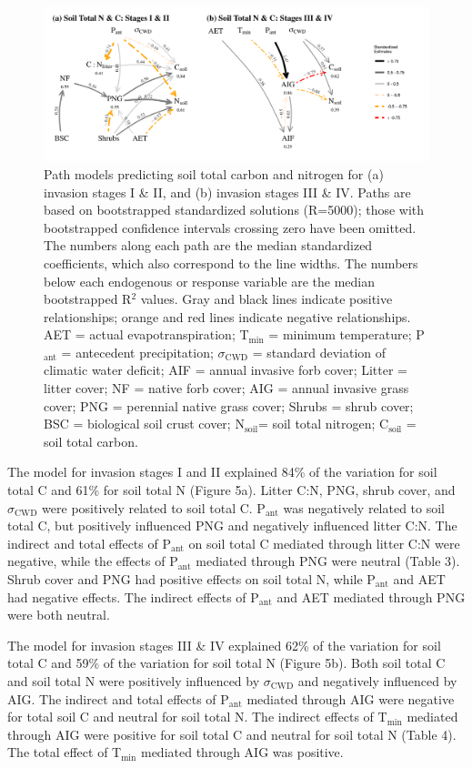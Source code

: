 \documentclass[
  11pt,
  a4paper,
]{article}
\begin{document}
\begin{figure}
\centering
\includegraphics{figures/newsems/soilcn_panel.png}
\caption{Path models predicting soil total carbon and nitrogen for (a) invasion stages I \& II, and (b) invasion stages III \& IV. Paths are based on bootstrapped standardized solutions (R=5000); those with bootstrapped confidence intervals crossing zero have been omitted. The numbers along each path are the median standardized coefficients, which also correspond to the line widths. The numbers below each endogenous or response variable are the median bootstrapped R\(^2\) values. Gray and black lines indicate positive relationships; orange and red lines indicate negative relationships. AET = actual evapotranspiration; T\(_\text{min}\) = minimum temperature; P\(_\text{ant}\) = antecedent precipitation; \(\sigma_\text{CWD}\) = standard deviation of climatic water deficit; AIF = annual invasive forb cover; Litter = litter cover; NF = native forb cover; AIG = annual invasive grass cover; PNG = perennial native grass cover; Shrubs = shrub cover; BSC = biological soil crust cover; N\(_\text{soil}\)= soil total nitrogen; C\(_\text{soil}\) = soil total carbon.}
\end{figure}

The model for invasion stages I and II explained 84\% of the variation for soil total C and 61\% for soil total N (Figure 5a). Litter C:N, PNG, shrub cover, and \(\sigma_\text{CWD}\) were positively related to soil total C. P\(_\text{ant}\) was negatively related to soil total C, but positively influenced PNG and negatively influenced litter C:N. The indirect and total effects of P\(_\text{ant}\) on soil total C mediated through litter C:N were negative, while the effects of P\(_\text{ant}\) mediated through PNG were neutral (Table 3). Shrub cover and PNG had positive effects on soil total N, while P\(_\text{ant}\) and AET had negative effects. The indirect effects of P\(_\text{ant}\) and AET mediated through PNG were both neutral.

The model for invasion stages III \& IV explained 62\% of the variation for soil total C and 59\% of the variation for soil total N (Figure 5b). Both soil total C and soil total N were positively influenced by \(\sigma_\text{CWD}\) and negatively influenced by AIG. The indirect and total effects of P\(_\text{ant}\) mediated through AIG were negative for total soil C and neutral for soil total N. The indirect effects of T\(_\text{min}\) mediated through AIG were positive for soil total C and neutral for soil total N (Table 4). The total effect of T\(_\text{min}\) mediated through AIG was positive.
\end{document}
